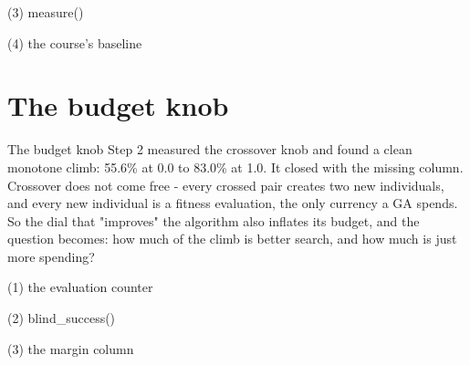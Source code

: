 \begin{frame}[fragile]{(3) measure()}

\end{frame}

\begin{frame}[fragile]{(4) the course's baseline}

\end{frame}


\section{The budget knob}

\begin{frame}{The budget knob}
Step 2 measured the crossover knob and found a clean monotone climb: 55.6\%
at 0.0 to 83.0\% at 1.0. It closed with the missing column. Crossover does
not come free - every crossed pair creates two new individuals, and every
new individual is a fitness evaluation, the only currency a GA spends. So
the dial that "improves" the algorithm also inflates its budget, and the
question becomes: how much of the climb is better search, and how much is
just more spending?
\end{frame}

\begin{frame}[fragile]{(1) the evaluation counter}

\end{frame}

\begin{frame}[fragile]{(2) blind\_success()}

\end{frame}

\begin{frame}[fragile]{(3) the margin column}

\end{frame}

